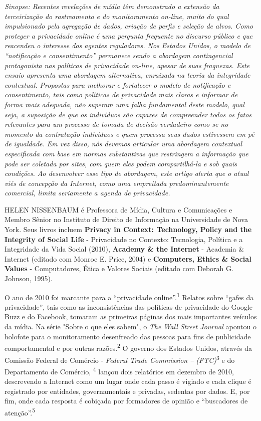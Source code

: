 \emph{Sinopse: Recentes revelações de mídia têm demonstrado a extensão
da terceirização do rastreamento e do monitoramento on-line, muito do
qual impulsionado pela agregação de dados, criação de perfis e seleção
de alvos. Como proteger a privacidade online é uma pergunta frequente no
discurso público e que reacendeu o interesse dos agentes reguladores.
Nos Estados Unidos, o modelo de ``notificação e consentimento''
permanece sendo a abordagem contingencial protagonista nas políticas de
privacidade on-line, apesar de suas fraquezas. Este ensaio apresenta uma
abordagem alternativa, enraizada na teoria da integridade contextual.
Propostas para melhorar e fortalecer o modelo de notificação e
consentimento, tais como políticas de privacidade mais claras e informar
de forma mais adequada, não superam uma falha fundamental deste modelo,
qual seja, a suposição de que os indivíduos são capazes de compreender
todos os fatos relevantes para um processo de tomada de decisão
verdadeiro como se no momento da contratação indivíduos e quem processa
seus dados estivessem em pé de igualdade. Em vez disso, nós devemos
articular uma abordagem contextual especificada com base em normas
substantivas que restringem a informação que pode ser coletada por
sites, com quem eles podem compartilhá-la e sob quais condições. Ao
desenvolver esse tipo de abordagem, este artigo alerta que o atual viés
de concepção da Internet, como uma empreitada predominantemente
comercial, limita seriamente a agenda de privacidade.}

HELEN NISSENBAUM é Professora de Mídia, Cultura e Comunicações e Membro
Sênior no Instituto de Direito de Informação na Universidade de Nova
York. Seus livros incluem \textbf{Privacy in Context: Technology, Policy
and the Integrity of Social Life} - Privacidade no Contexto: Tecnologia,
Política e a Integridade da Vida Social (2010), \textbf{Academy \& the
Internet} - Academia \& Internet (editado com Monroe E. Price, 2004) e
\textbf{Computers, Ethics \& Social Values} - Computadores, Ética e
Valores Sociais (editado com Deborah G. Johnson, 1995).

O ano de 2010 foi marcante para a ``privacidade
online''.\textsuperscript{{1}} Relatos sobre ``gafes da privacidade'',
tais como as inconsistências das políticas de privacidade do Google Buzz
e do Facebook, tomaram as primeiras páginas dos mais importantes
veículos da mídia. Na série "Sobre o que eles sabem", o \emph{The Wall
Street Journal} apontou o holofote para o monitoramento desenfreado das
pessoas para fins de publicidade comportamental e por outras
razões.\textsuperscript{{2}} O governo dos Estados Unidos, através da
Comissão Federal de Comércio - \emph{Federal Trade Commission --
(FTC)}\textsuperscript{{3}} e do Departamento de Comércio,
\textsuperscript{{4}} lançou dois relatórios em dezembro de 2010,
descrevendo a Internet como um lugar onde cada passo é vigiado e cada
clique é registrado por entidades, governamentais e privadas, sedentas
por dados. E, por fim, onde cada resposta é cobiçada por formadores de
opinião e ``buscadores de atenção''.\textsuperscript{{5}}

